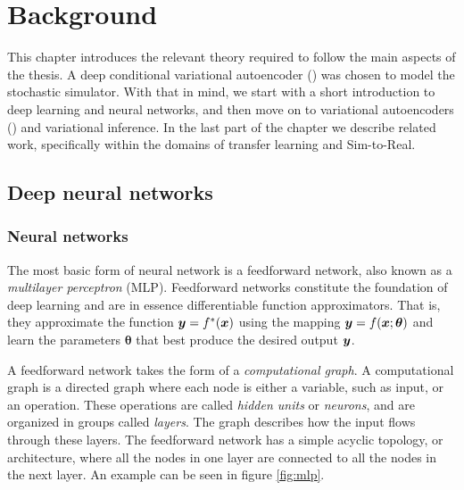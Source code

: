 
\chapter{Background}
\label{background}
This chapter introduces the relevant theory required to follow the main aspects of the thesis. A deep conditional variational autoencoder (\cvae{}) was chosen to model the stochastic simulator. With that in mind, we start with a short introduction to deep learning and neural networks, and then move on to variational autoencoders (\vae{}) and variational inference. In the last part of the chapter we describe related work, specifically within the domains of transfer learning and Sim-to-Real.


\section{Deep neural networks}
\subsection{Neural networks}
The most basic form of neural network is a feedforward network, also known as a \emph{multilayer perceptron} (MLP). Feedforward networks constitute the foundation of deep learning and are in essence differentiable function approximators. That is, they approximate the function $\boldsymbol{y}=f^{*}(\boldsymbol{x})$ using the mapping $\boldsymbol{y} = f(\boldsymbol{x}; \boldsymbol{\theta})$ and learn the parameters $\pmb{\theta}$ that best produce the desired output $\boldsymbol{y}$.

A feedforward network takes the form of a \textit{computational graph}. A computational graph is a directed graph where each node is either a variable, such as input, or an operation. These operations are called \emph{hidden units} or \emph{neurons}, and are organized in groups called \emph{layers}. The graph describes how the input flows through these layers.
The feedforward network has a simple acyclic topology, or architecture, where all the nodes in one layer are connected to all the nodes in the next layer. An example can be seen in figure \ref{fig:mlp}.

